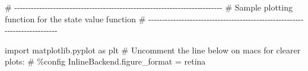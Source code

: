 \documentclass[
  letterpaper,
  DIV=11,
  numbers=noendperiod]{scrartcl}
\newenvironment{Shaded}{\begin{snugshade}}{\end{snugshade}}
\newcommand{\CommentTok}[1]{\textcolor[rgb]{0.37,0.37,0.37}{#1}}
\newcommand{\ImportTok}[1]{\textcolor[rgb]{0.00,0.46,0.62}{#1}}
\newcommand{\NormalTok}[1]{\textcolor[rgb]{0.00,0.23,0.31}{#1}}
\begin{document}
\begin{Shaded}
\begin{Highlighting}[]
\CommentTok{\# {-}{-}{-}{-}{-}{-}{-}{-}{-}{-}{-}{-}{-}{-}{-}{-}{-}{-}{-}{-}{-}{-}{-}{-}{-}{-}{-}{-}{-}{-}{-}{-}{-}{-}{-}{-}{-}{-}{-}{-}{-}{-}{-}{-}{-}{-}{-}{-}{-}{-}{-}{-}{-}{-}{-}{-}{-}{-}{-}{-}{-}{-}{-}{-}{-}{-}{-}{-}{-}{-}{-}{-}{-}{-}{-}}
\CommentTok{\# Sample plotting function for the state value function}
\CommentTok{\# {-}{-}{-}{-}{-}{-}{-}{-}{-}{-}{-}{-}{-}{-}{-}{-}{-}{-}{-}{-}{-}{-}{-}{-}{-}{-}{-}{-}{-}{-}{-}{-}{-}{-}{-}{-}{-}{-}{-}{-}{-}{-}{-}{-}{-}{-}{-}{-}{-}{-}{-}{-}{-}{-}{-}{-}{-}{-}{-}{-}{-}{-}{-}{-}{-}{-}{-}{-}{-}{-}{-}{-}{-}{-}{-}        }

\ImportTok{import}\NormalTok{ matplotlib.pyplot }\ImportTok{as}\NormalTok{ plt}
\CommentTok{\# Uncomment the line below on macs for clearer plots:}
\CommentTok{\# \%config InlineBackend.figure\_format = \textquotesingle{}retina\textquotesingle{} }


\end{Highlighting}
\end{Shaded}
\end{document}
